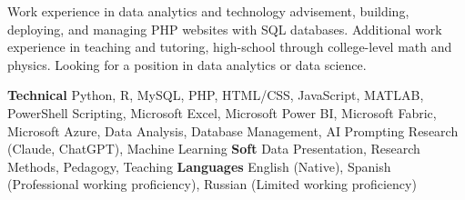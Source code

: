 

\begin{cvparagraph}


	Work experience in data analytics and technology advisement, building, deploying, and managing PHP websites with SQL databases. Additional work experience in teaching and tutoring, high-school through college-level math and physics. Looking for a position in data analytics or data science.

\end{cvparagraph}


\begin{cvparagraph}
	
	\textbf{Technical} \hspace{2mm} Python, R, MySQL, PHP, HTML/CSS, JavaScript, MATLAB, PowerShell Scripting, Microsoft Excel, Microsoft Power BI, Microsoft Fabric, Microsoft Azure, Data Analysis, Database Management, AI Prompting Research (Claude, ChatGPT), Machine Learning
	\newline
	\textbf{Soft} \hspace{2mm} Data Presentation, Research Methods, Pedagogy, Teaching
	\newline
	\textbf{Languages} \hspace{2mm} English (Native), Spanish (Professional working proficiency), Russian (Limited working proficiency)
	
\end{cvparagraph}
